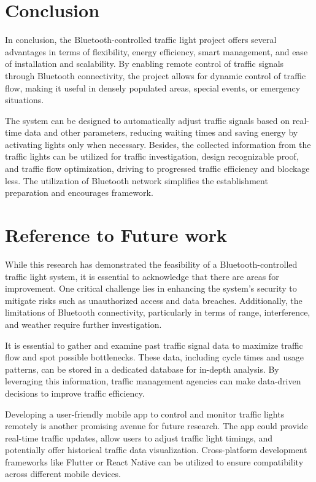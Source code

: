 \documentclass[conference, onecolumn]{IEEEtran}
\begin{document}
\section{Conclusion}
In conclusion, the Bluetooth-controlled traﬃc light project offers several advantages in terms of ﬂexibility, energy eﬃciency, smart management, and ease of installation and scalability. By enabling remote control of traﬃc signals through Bluetooth connectivity, the project allows for dynamic control of traﬃc ﬂow, making it useful in densely populated areas, special events, or emergency situations.\par

The system can be designed to automatically adjust traﬃc signals based on real-time data and other parameters, reducing waiting times and saving energy by activating lights only when necessary. Besides, the collected information from the traﬃc lights can be utilized for traﬃc investigation, design recognizable proof, and traﬃc ﬂow optimization, driving to progressed traﬃc eﬃciency and blockage less. The utilization of Bluetooth network simpliﬁes the establishment preparation and encourages framework.\\

\section{Reference to Future work}
While this research has demonstrated the feasibility of a Bluetooth-controlled traffic light system, it is essential to acknowledge that there are areas for improvement. One critical challenge lies in enhancing the system's security to mitigate risks such as unauthorized access and data breaches. Additionally, the limitations of Bluetooth connectivity, particularly in terms of range, interference, and weather require further investigation.\par

It is essential to gather and examine past traffic signal data to maximize traffic flow and spot possible bottlenecks. These data, including cycle times and usage patterns, can be stored in a dedicated database for in-depth analysis. By leveraging this information, traffic management agencies can make data-driven decisions to improve traffic efficiency.\par

Developing a user-friendly mobile app to control and monitor traffic lights remotely is another promising avenue for future research. The app could provide real-time traffic updates, allow users to adjust traffic light timings, and potentially offer historical traffic data visualization. Cross-platform development frameworks like Flutter or React Native can be utilized to ensure compatibility across different mobile devices.\par
\end{document}
